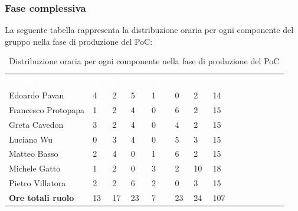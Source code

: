 \subsubsection{Fase complessiva}
La seguente tabella rappresenta la distribuzione oraria per ogni componente del gruppo nella fase di produzione del PoC:
\begin{table}[!htbp]
\begin{center}
\renewcommand{\arraystretch}{1.25}
\begin{tabular}{ m{}<{\centering}  m{}<{\centering} m{}<{\centering} m{}<{\centering}  m{}<{\centering}  m{}<{\centering}  m{}<{\centering}  m{}<{\centering}   }
	\rowcolor{darkblue}
	\textcolor{white}{\textbf{Componente}} &\textcolor{white}{\textbf{Re}}&\textcolor{white}{\textbf{Pt}}&\textcolor{white}{\textbf{An}}&\textcolor{white}{\textbf{Am}}&\textcolor{white}{\textbf{Pr}}&\textcolor{white}{\textbf{Ve}}&\textcolor{white}{\textbf{Ore complessive}}\\ 
	Edoardo Pavan & 4 & 2 & 5 & 1 & 0 & 2 & 14 \\	
	
	Francesco Protopapa & 1 & 2 & 4 & 0 & 6 & 2 & 15 \\

	Greta Cavedon & 3 & 2 & 4 & 0 & 4& 2 & 15 \\
	
	Luciano Wu & 0 & 3 & 4 & 0 & 5 & 3 & 15\\
	
	Matteo Basso & 2 & 4 & 0 & 1 & 6 & 2 & 15 \\
	
	Michele Gatto & 1 & 2 & 0 & 3 & 2 & 10 & 18\\
	
	Pietro Villatora & 2 & 2 & 6 & 2 & 0 & 3 & 15 \\
	
	\textbf{Ore totali ruolo} & 13 & 17 & 23 & 7 & 23 & 24 & 107\\

\end{tabular}
\caption{Distribuzione oraria per ogni componente nella fase di produzione del PoC}
\end{center}
\end{table}

